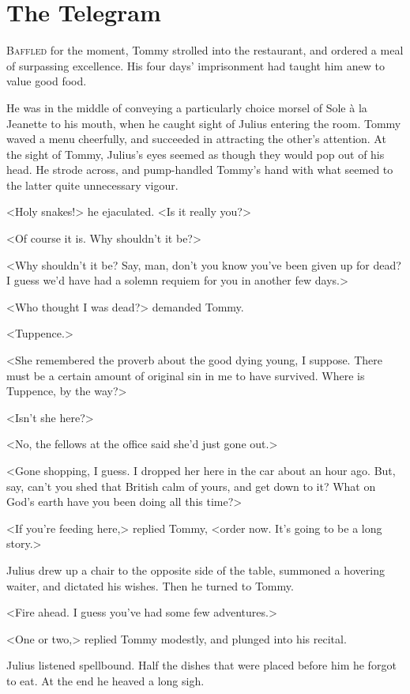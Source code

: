 \chapter{The Telegram} 

 \lettrine{B}{affled} for the moment, Tommy strolled into the restaurant, and ordered a meal of surpassing excellence. His four days' imprisonment had taught him anew to value good food.

\zz
He was in the middle of conveying a particularly choice morsel of Sole à la Jeanette to his mouth, when he caught sight of Julius entering the room. Tommy waved a menu cheerfully, and succeeded in attracting the other's attention. At the sight of Tommy, Julius's eyes seemed as though they would pop out of his head. He strode across, and pump-handled Tommy's hand with what seemed to the latter quite unnecessary vigour.

<Holy snakes!> he ejaculated. <Is it really you?>

<Of course it is. Why shouldn't it be?>

<Why shouldn't it be? Say, man, don't you know you've been given up for dead? I guess we'd have had a solemn requiem for you in another few days.>

<Who thought I was dead?> demanded Tommy.

<Tuppence.>

<She remembered the proverb about the good dying young, I suppose. There must be a certain amount of original sin in me to have survived. Where is Tuppence, by the way?>

<Isn't she here?>

<No, the fellows at the office said she'd just gone out.>

<Gone shopping, I guess. I dropped her here in the car about an hour ago. But, say, can't you shed that British calm of yours, and get down to it? What on God's earth have you been doing all this time?>

<If you're feeding here,> replied Tommy, <order now. It's going to be a long story.>

Julius drew up a chair to the opposite side of the table, summoned a hovering waiter, and dictated his wishes. Then he turned to Tommy.

<Fire ahead. I guess you've had some few adventures.>

<One or two,> replied Tommy modestly, and plunged into his recital.

Julius listened spellbound. Half the dishes that were placed before him he forgot to eat. At the end he heaved a long sigh.

